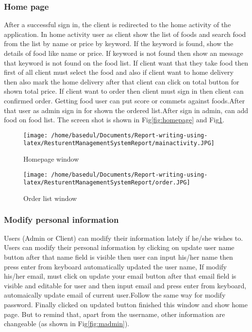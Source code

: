 \documentclass[12pt,a4paper]{article}
\newcommand\tab[1][.7cm]{\hspace*{#1}}
\begin{document}
		\subsubsection{Home page}
			\tab After a successful sign in, the client is redirected to the home activity of the application. In home activity user as client show the list of foods and search food from the list by name or price by keyword. If the keyword is found, show the details of food like name or price. If keyword is not found then show an message that keyword is not found on the food list. If client want that they take food then first of all client must select the food and also if client want to home delivery then also mark the home delivery after that client can click on total button for shown total price. If client want to order then client must sign in then client can confirmed order. Getting food user can put score or commets against foods.After that user as admin sign in for shown the ordered list.After sign in admin, can add food on food list. The screen shot is shown in Fig\ref{fig:homepage} and Fig\ref{fig:topfood1}.
			\begin{figure}[H]
		\centering
		\texttt{[image: /home/basedul/Documents/Report-writing-using-latex/ResturentManagementSystemReport/mainactivity.JPG]}
		\caption{\hspace{0.35em}Homepage window}
		\label{fig:homepage} 
		
		
		\vspace{2cm}
		
		
		\texttt{[image: /home/basedul/Documents/Report-writing-using-latex/ResturentManagementSystemReport/order.JPG]}
		\caption{\hspace{0.35em}Order list window}
		\label{fig:topfood1} 	
		
		
		\end{figure}
		
		
		
		\subsubsection{Modify personal information}
	\tab Users (Admin or Client) can modify their information lately if he/she wishes to. Users can modify their personal information by clicking on update user name button after that name field is visible then user can input his/her name then press enter from keyboard automatically updated the user name, If modify his/her email, must click on update your email button after that email field is visible and editable for user and then input email and press enter from keyboard, automaically update email of current user.Follow the same way for modify password. Finally clicked on updated button finished this window and show home page. But to remind that, apart from the username, other information are changeable (as shown in Fig\ref{fig:madmin}).
	
\end{document}

